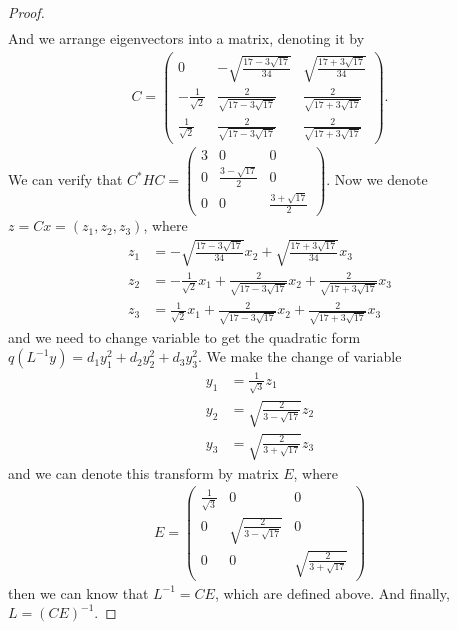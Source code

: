 \documentclass[11pt]{book}
\theoremstyle{definition}
\numberwithin{equation}{subsection}
\begin{document}
\begin{proof}
\begin{align*}
\end{align*}
And we arrange eigenvectors into a matrix, denoting it by 
\begin{align*}
    C = \left(\begin{matrix}
    0 & -\sqrt{\frac{17-3\sqrt{17}}{34}} & \sqrt{\frac{17+3\sqrt{17}}{34}} \\
    - \frac{1}{\sqrt{2}} & \frac{2}{\sqrt{17-3\sqrt{17}}} & \frac{2}{\sqrt{17+3\sqrt{17}}} \\
    \frac{1}{\sqrt{2}} & \frac{2}{\sqrt{17-3\sqrt{17}}} & \frac{2}{\sqrt{17+3\sqrt{17}}}
    \end{matrix}\right).
\end{align*}
We can verify that $C^*HC = \left(
\begin{matrix}
3 & 0 & 0\\
0 & \frac{3-\sqrt{17}}{2} & 0\\
0 & 0 & \frac{3+\sqrt{17}}{2}
\end{matrix}
\right)$. Now we denote $z = Cx = (z_1, z_2, z_3)$, where 
\begin{align*}
    z_1 & = -\sqrt{\frac{17-3\sqrt{17}}{34}}x_2 + \sqrt{\frac{17+3\sqrt{17}}{34}}x_3\\
    z_2 & = - \frac{1}{\sqrt{2}}x_1 + \frac{2}{\sqrt{17-3\sqrt{17}}}x_2 + \frac{2}{\sqrt{17+3\sqrt{17}}}x_3 \\
    z_3 & = \frac{1}{\sqrt{2}}x_1 + \frac{2}{\sqrt{17-3\sqrt{17}}}x_2 + \frac{2}{\sqrt{17+3\sqrt{17}}}x_3
\end{align*}
and we need to change variable to get the quadratic form $q\left(  L^{-1}y\right)  =d_{1}y_{1}^{2}+d_{2}y_{2}^{2}+d_{3}y_{3}^{2}$. We make the change of variable
\begin{align*}
    y_1 & = \frac{1}{\sqrt{3}}z_1 \\
    y_2 & = \sqrt{\frac{2}{3-\sqrt{17}}} z_2\\
    y_3 & = \sqrt{\frac{2}{3+\sqrt{17}}} z_3
\end{align*}
and we can denote this transform by matrix $E$, where 
\begin{align*}
    E = \left(
    \begin{matrix}
    \frac{1}{\sqrt{3}} & 0 & 0\\
    0 & \sqrt{\frac{2}{3-\sqrt{17}}} & 0\\
    0 & 0 & \sqrt{\frac{2}{3+\sqrt{17}}}
    \end{matrix}
    \right)
\end{align*}
then we can know that $L^{-1} = CE$, which are defined above. And finally, $L = (CE)^{-1}$.
\end{proof}
\end{document}
